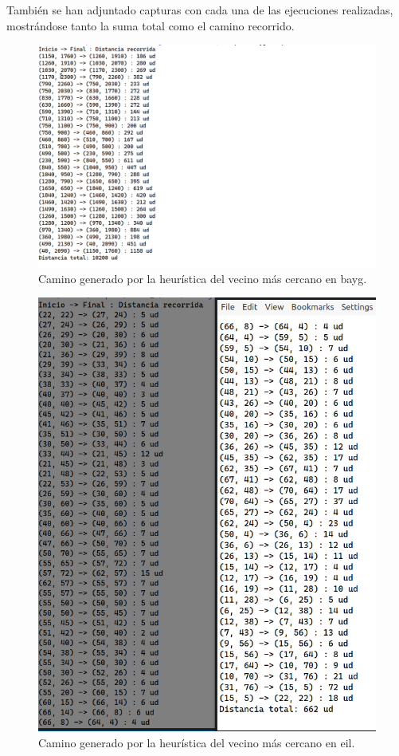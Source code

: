 También se han adjuntado capturas con cada una de las ejecuciones realizadas, mostrándose tanto la suma
total como el camino recorrido.

\begin{figure}[H]
  \centering
  \includegraphics[scale=0.5]{img/dist-vecinos-bayg.png}
  \caption{Camino generado por la heurística del vecino más cercano en bayg.}
\end{figure}

\begin{figure}[H] 
  \centering
  \includegraphics[scale=0.5]{img/dist-vecinos-eil.png}
  \caption{Camino generado por la heurística del vecino más cercano en eil.}
\end{figure}

